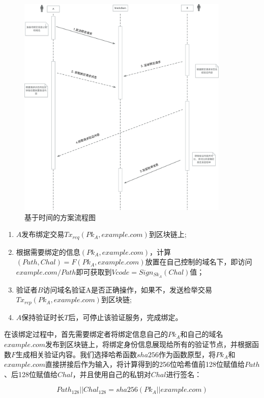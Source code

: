 \begin{figure}[htbp]
 	\centering
 	\includegraphics[width = 0.9\textwidth]{img/time_based_workflow}
 	\caption{基于时间的方案流程图}\label{fig:time_based_workflow}
\end{figure}


\begin{enumerate}
	\item $A$发布绑定交易$Tx_{req}(Pk_A, example.com)$到区块链上;
	\item 根据需要绑定的信息$(Pk_A, example.com)$，计算$(Path, Chal) = F(Pk_A, example.com)$放置在自己控制的域名下，即访问$example.com/Path$即可获取到$Vcode = Sign_{Sk_A}(Chal)$值；
	\item 验证者$B$访问域名验证A是否正确操作，如果不，发送检举交易$Tx_{rep}(Pk_A, example.com)$到区块链;
	\item $A$保持验证时长$T$后，可停止该验证服务，完成绑定。
\end{enumerate}


在该绑定过程中，首先需要绑定者将绑定信息自己的$Pk_A$和自己的域名$example.com$发布到区块链上，将绑定身份信息展现给所有的验证节点，并根据函数$F$生成相关验证内容。我们选择哈希函数$sha256$作为函数原型，将$Pk_A$和$example.com$直接拼接后作为输入，将计算得到的256位哈希值前128位赋值给$Path$、后128位赋值给$Chal$，并且使用自己的私钥对$Chal$进行签名：

\begin{equation}\label{eqF}
Path_{128}||Chal_{128} = sha256(Pk_A||example.com)
\end{equation}

